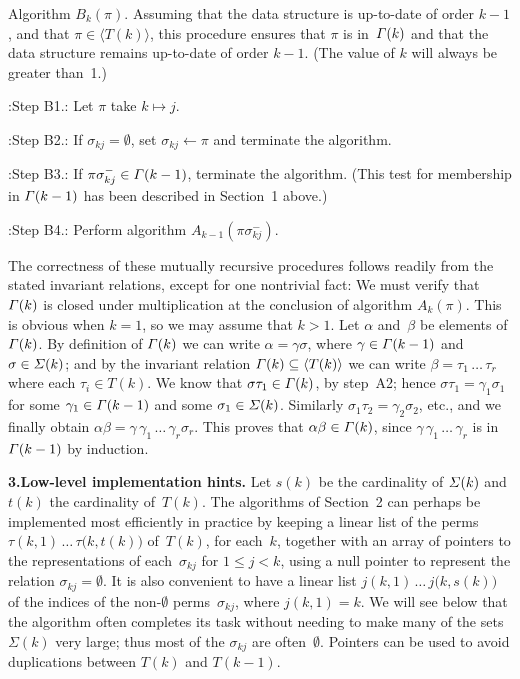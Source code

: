 \medskip
\noindent
{\sc Algorithm} $B_k(\pi)$.\enspace
Assuming that the data structure is up-to-date of order $k-1$, and that
$\pi\in\langle T(k)\rangle$, this procedure ensures that $\pi$ is
in~${\mit\Gamma}(k)$ and that the data structure remains up-to-date of
order $k-1$. (The value of $k$ will always be greater than~1.)

\display 50pt:Step B1.:
Let $\pi$ take $k\mapsto j$.

\display 50pt:Step B2.:
If $\sigma_{kj}=\emptyset$, set $\sigma_{kj}\gets\pi$ and terminate the algorithm.

\display 50pt:Step B3.:
If $\pi\sigma_{kj}^-\in{\mit\Gamma}(k-1)$, terminate the algorithm.
(This test for membership in ${\mit\Gamma}(k-1)$ has been described in Section~1 above.)

\display 50pt:Step B4.:
Perform algorithm $A_{k-1}(\pi\sigma_{kj}^-)$.\quad\blackslug

\medskip
The correctness of these mutually recursive procedures follows readily from
the stated invariant relations, except for one nontrivial fact: We must
verify that ${\mit\Gamma}(k)$ is closed under multiplication at the conclusion
of algorithm $A_k(\pi)$. This is obvious when $k=1$, so we may assume that
$k>1$. Let $\alpha$ and~$\beta$ be elements of ${\mit\Gamma}(k)$. By definition
of ${\mit\Gamma}(k)$ we can write $\alpha=\gamma\sigma$, where $\gamma\in{\mit\Gamma}(k-1)$
and $\sigma\in{\mit\Sigma}(k)$; and by the invariant relation ${\mit\Gamma}(k)\subseteq
\langle T(k)\rangle$ we can write $\beta=\tau_1\,\ldots\,\tau_r$ where each
$\tau_i\in T(k)$. We know that $\sigma\tau_1\in{\mit\Gamma}(k)$, by step~A2;
hence $\sigma\tau_1=\gamma_1\sigma_1$ for some $\gamma_1\in{\mit\Gamma}(k-1)$
and some $\sigma_1\in{\mit\Sigma}(k)$. Similarly $\sigma_1\tau_2=\gamma_2\sigma_2$,
etc., and we finally obtain $\alpha\beta=\gamma\,\gamma_1\,\ldots\,\gamma_r
\sigma_r$. This proves that $\alpha\beta\in{\mit\Gamma}(k)$, since
$\gamma\,\gamma_1\,\ldots\,\gamma_r$ is in ${\mit\Gamma}(k-1)$ by induction.

\medskip
\noindent
{\bf 3.\enspace Low-level implementation hints.}\enspace
Let $s(k)$ be the cardinality of ${\mit\Sigma}(k)$ and $t(k)$ the cardinality
of~$T(k)$. The algorithms of Section~2 can perhaps be implemented most
efficiently in practice by keeping a linear list of the
perms $\tau(k,1)\,\ldots\,\tau\bigl(k,t(k)\bigr)$ of~$T(k)$,
for each~$k$, together with an array of pointers to the
representations
of each~$\sigma_{kj}$ for $1\leq j<k$, using a null pointer to
represent the relation $\sigma_{kj}=\emptyset$. It is also convenient
to have a linear list $j(k,1)\,\ldots\,j\bigl(k,s(k)\bigr)$ of the
indices of the non-$\emptyset$ perms~$\sigma_{kj}$, where $j(k,1)=k$.
We will see below that the algorithm often completes its task without
needing to make many of the sets~$\Sigma(k)$ very large; thus most of
the $\sigma_{kj}$ are often~$\emptyset$.
Pointers can be used to avoid duplications between $T(k)$ and $T(k-1)$.

